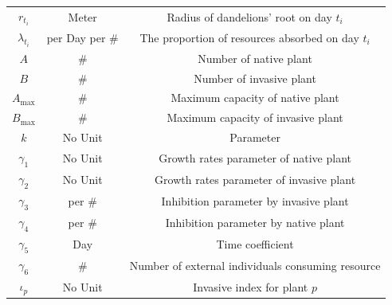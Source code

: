 \documentclass[12pt]{article}
\begin{document}
\begin{table}[H]
\begin{tabular}{ccc}
    $r_{t_i}$ & Meter & Radius of dandelions' root on day $t_i$ \\
    $\lambda_{t_i}$ & per Day per \# & The proportion of resources absorbed on day $t_i$ \\
    $A$ & \# & Number of native plant \\
    $B$ & \# & Number of invasive plant \\
    $A_{\max}$ & \# & Maximum capacity of native plant \\
    $B_{\max}$ & \# & Maximum capacity of invasive plant \\
    $k$ & No Unit & Parameter \\ %
    $\gamma_1$ & No Unit & Growth rates parameter of native plant \\ %
    $\gamma_2$ & No Unit & Growth rates parameter of invasive plant \\ %
    $\gamma_3$ & per \# & Inhibition parameter by invasive plant \\ %
    $\gamma_4$ & per \# & Inhibition parameter by native plant \\ %
    $\gamma_5$ & Day & Time coefficient \\ %
    $\gamma_6$ & \# & Number of external individuals consuming resource \\ %
    $\iota_p$ & No Unit & Invasive index for plant $p$\\

    \bottomrule[2pt]
\end{tabular}
\end{table}
\end{document}
